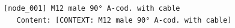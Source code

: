 \begin{lstlisting}[language=bash, caption={Hierarchical Knowledge Graph (HKG) embedding structural breadcrumbs into each node for context-aware retrieval.}]
[node_001] M12 male 90° A-cod. with cable
   Content: [CONTEXT: M12 male 90° A-cod. with cable]

\end{lstlisting}
